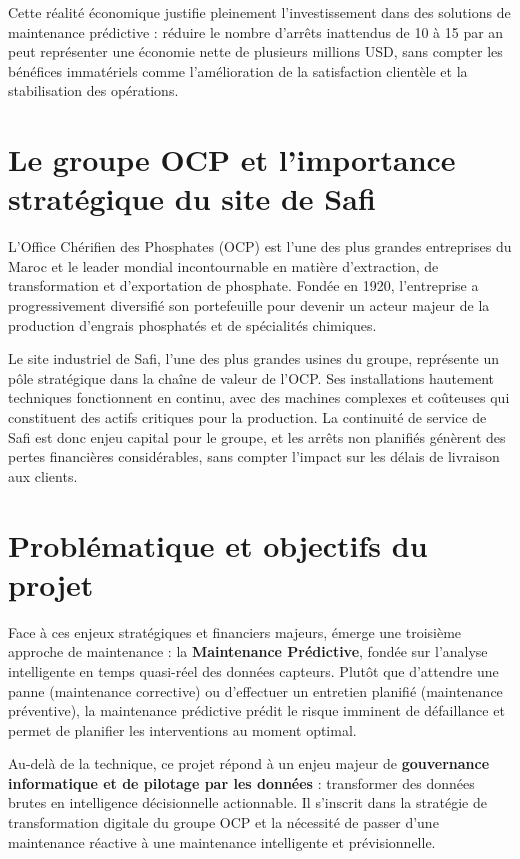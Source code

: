 \documentclass[a4paper,12pt,twoside]{report}
\begin{document}
Cette réalité économique justifie pleinement l'investissement dans des solutions de maintenance prédictive : réduire le nombre d'arrêts inattendus de 10 à 15 par an peut représenter une économie nette de plusieurs millions USD, sans compter les bénéfices immatériels comme l'amélioration de la satisfaction clientèle et la stabilisation des opérations.

\section*{Le groupe OCP et l'importance stratégique du site de Safi}

L'Office Chérifien des Phosphates (OCP) est l'une des plus grandes entreprises du Maroc et le leader mondial incontournable en matière d'extraction, de transformation et d'exportation de phosphate. Fondée en 1920, l'entreprise a progressivement diversifié son portefeuille pour devenir un acteur majeur de la production d'engrais phosphatés et de spécialités chimiques.

Le site industriel de Safi, l'une des plus grandes usines du groupe, représente un pôle stratégique dans la chaîne de valeur de l'OCP. Ses installations hautement techniques fonctionnent en continu, avec des machines complexes et coûteuses qui constituent des actifs critiques pour la production. La continuité de service de Safi est donc enjeu capital pour le groupe, et les arrêts non planifiés génèrent des pertes financières considérables, sans compter l'impact sur les délais de livraison aux clients.

\section*{Problématique et objectifs du projet}

Face à ces enjeux stratégiques et financiers majeurs, émerge une troisième approche de maintenance : la \textbf{Maintenance Prédictive}, fondée sur l'analyse intelligente en temps quasi-réel des données capteurs. Plutôt que d'attendre une panne (maintenance corrective) ou d'effectuer un entretien planifié (maintenance préventive), la maintenance prédictive prédit le risque imminent de défaillance et permet de planifier les interventions au moment optimal.

Au-delà de la technique, ce projet répond à un enjeu majeur de \textbf{gouvernance informatique et de pilotage par les données} : transformer des données brutes en intelligence décisionnelle actionnable. Il s'inscrit dans la stratégie de transformation digitale du groupe OCP et la nécessité de passer d'une maintenance réactive à une maintenance intelligente et prévisionnelle.
\end{document}
